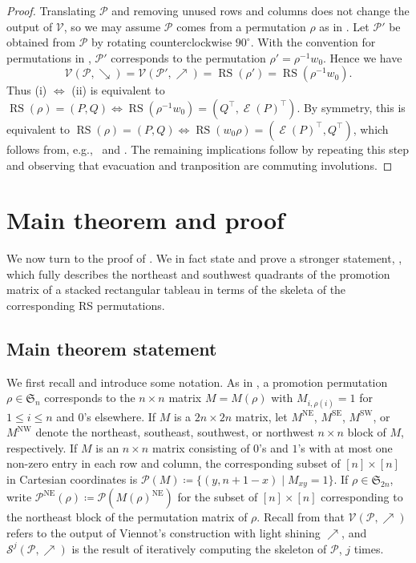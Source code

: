 \documentclass{amsart}
\theoremstyle{definition}
\DeclareMathOperator{\RS}{RS}
\DeclareMathOperator{\NE}{NE}
\DeclareMathOperator{\NW}{NW}
\DeclareMathOperator{\SE}{SE}
\DeclareMathOperator{\SW}{SW}
\DeclareMathOperator{\evacuation}{\mathcal{E}}
\begin{document}
\begin{proof}
    Translating $\mathcal{P}$ and removing unused rows and columns does not change the output of $\mathcal{V}$, so we may assume $\mathcal{P}$ comes from a permutation $\rho$ as in . Let $\mathcal{P}'$ be obtained from $\mathcal{P}$ by rotating counterclockwise $90^\circ$. With the convention for permutations in , $\mathcal{P}'$ corresponds to the permutation $\rho' = \rho^{-1} w_0$. Hence we have
      \[ \mathcal{V}(\mathcal{P}, \searrow) = \mathcal{V}(\mathcal{P}', \nearrow) = \RS(\rho') = \RS(\rho^{-1} w_0). \]
    Thus (i) $\Leftrightarrow$ (ii) is equivalent to $\RS(\rho) = (P, Q) \Leftrightarrow \RS(\rho^{-1} w_0) = (Q^\top, \evacuation(P)^\top)$. By symmetry, this is equivalent to $\RS(\rho) = (P, Q) \Leftrightarrow \RS(w_0 \rho) = (\evacuation(P)^\top, Q^\top)$, which follows from, e.g.,~\cite[Thm.~A1.2.10]{Stanley:EC2} and \cite[A1.2.11]{Stanley:EC2}. The remaining implications follow by repeating this step and observing that evacuation and tranposition are commuting involutions.
\end{proof}

\section{Main theorem and proof}\label{sec:main}

We now turn to the proof of . We in fact state and prove a stronger statement, , which fully describes the northeast and southwest quadrants of the promotion matrix of a stacked rectangular tableau in terms of the skeleta of the corresponding RS permutations.

\subsection{Main theorem statement}

We first recall and introduce some notation. As in , a promotion permutation $\rho \in \mathfrak{S}_n$ corresponds to the $n \times n$ matrix $M = M(\rho)$ with $M_{i, \rho(i)} = 1$ for $1 \leq i \leq n$ and $0$'s elsewhere. If $M$ is a $2n \times 2n$ matrix, let $M^{\NE}$, $M^{\SE}$, $M^{\SW}$, or $M^{\NW}$ denote the northeast, southeast, southwest, or northwest $n \times n$ block of $M$, respectively. If $M$ is an $n \times n$ matrix consisting of $0$'s and $1$'s with at most one non-zero entry in each row and column, the corresponding subset of $[n] \times [n]$ in Cartesian coordinates is $\mathcal{P}(M) \coloneqq \{(y, n+1-x) \mid M_{xy}=1\}$. If $\rho \in \mathfrak{S}_{2n}$, write $\mathcal{P}^{\NE}(\rho) \coloneqq \mathcal{P}(M(\rho)^{\NE})$ for the subset of $[n] \times [n]$ corresponding to the northeast block of the permutation matrix of $\rho$. Recall from  that $\mathcal{V}(\mathcal{P}, \nearrow)$ refers to the output of Viennot's construction with light shining $\nearrow$, and $\mathcal{S}^j(\mathcal{P}, \nearrow)$ is the result of iteratively computing the skeleton of $\mathcal{P}$, $j$ times.
\end{document}
